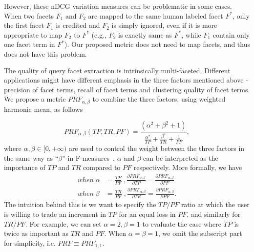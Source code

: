 However, these nDCG variation measures can be problematic in some cases.
When two facets $F_1$ and $F_2$ are mapped to the same human labeled facet $F^*$, only the first facet $F_1$ is credited and $F_2$ is simply ignored, even if it is more appropriate to map $F_2$ to $F^*$ (e.g., $F_2$ is exactly same as $F^*$, while $F_1$ contain only one facet term in $F^*$). Our proposed metric does not need to map facets, and thus does not have this problem.

The quality of query facet extraction is intrinsically multi-faceted. Different applications might have different emphasis in the three factors mentioned above - precision of facet terms, recall of facet terms 
and clustering quality of facet terms. We propose a metric $PRF_{\alpha,\beta}$ to combine the three factors, using weighted harmonic mean, as follows

\begin{equation}
\label{eq:prf}
 P\!R\!F_{\alpha,\beta}(T\!P, T\!R, P\!F) = \frac{(\alpha^2 + \beta^2 + 1)}{\frac{\alpha^2}{T\!P} + \frac{\beta^2}{T\!R} + \frac{1}{P\!F}},
\end{equation}
where $\alpha,\beta \in [0,+\infty)$ are used to control the weight between the three factors in the same way as ``$\beta$'' in F-measures~\cite{van1979information}. $\alpha$ and $\beta$ can be interpreted as the importance of $T\!P$ and $T\!R$ compared to $P\!F$ respectively. More formally, we have 
\begin{equation}
\begin{split} 
 when\; \alpha &= \frac{T\!P}{P\!F} \;, \frac{\partial P\!R\!F_{\alpha,\beta}}{\partial T\!P} = \frac{\partial P\!R\!F_{\alpha,\beta}}{\partial P\!F}\\
 when\; \beta &= \frac{T\!R}{P\!F} \;, \frac{\partial P\!R\!F_{\alpha,\beta}}{\partial T\!R} = \frac{\partial P\!R\!F_{\alpha,\beta}}{\partial P\!F}.
\end{split}
\end{equation}
The intuition behind this is we want to specify the $T\!P/P\!F$ ratio at which the user is willing to trade an increment in $T\!P$ for an equal loss in $P\!F$, and similarly for $T\!R/P\!F$. For example, we can set $\alpha\!=\!2,\beta\!=\!1$ to evaluate the case where $T\!P$ is twice as important as $T\!R$ and $P\!F$. When $\alpha \!=\! \beta \!=\! 1$, we omit the subscript part for simplicity, i.e. $PRF \equiv PRF_{1,1}$.

